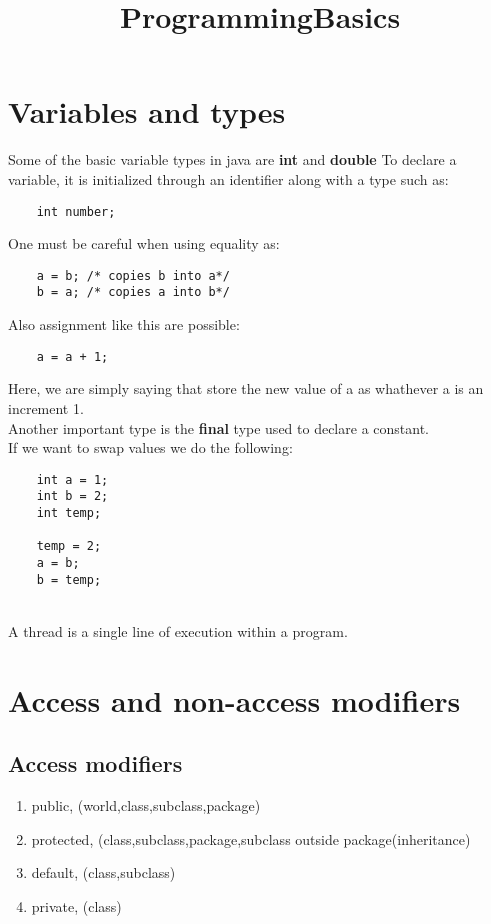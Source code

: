 \documentclass{article}
\date{\vspace{-5ex}}
\title{ProgrammingBasics}
\begin{document}
\maketitle

\section{Variables and types}
Some of the basic variable types in java are \textbf{int} and \textbf{double}
To declare a variable, it is initialized through an identifier along with a type such as:

\begin{verbatim}
    int number; 
\end{verbatim}

One must be careful when using equality as:
\begin{verbatim}
    a = b; /* copies b into a*/
    b = a; /* copies a into b*/
\end{verbatim}

Also assignment like this are possible:

\begin{verbatim}
    a = a + 1;
\end{verbatim}

Here, we are simply saying that store the new value of a as whathever a is an increment 1. 
\\
Another important type is the \textbf{final} type used to declare a constant. 
\\
If we want to swap values we do the following:
\begin{verbatim}
    int a = 1;
    int b = 2;
    int temp;
    
    temp = 2;
    a = b;
    b = temp;
\end{verbatim}
\\
A thread is a single line of execution within a program. 

\section{Access and non-access modifiers}

\subsection{Access modifiers}

\begin{enumerate}
    \item public, (world,class,subclass,package)
    \item protected, (class,subclass,package,subclass outside package(inheritance)
    \item default, (class,subclass)
    \item private, (class)
\end{enumerate}

\begin{comment}


\end{comment}
\end{document}
